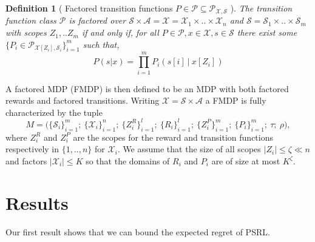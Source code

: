 \documentclass{article}
\newtheorem{mydef}{Definition}
\newcommand{\Xc}{\mathcal{X}}
\newcommand{\Pc}{\mathcal{P}}
\newcommand{\Sc}{\mathcal{S}}
\newcommand{\Ac}{\mathcal{A}}
\begin{document}
\begin{mydef}[ Factored transition functions $P \in \Pc \subseteq \Pc_{\Xc,\Sc}$ ]
\hspace{0.000000001mm} \newline
The transition function class $\Pc$ is factored over $\Sc \times \Ac = \Xc = \Xc_1 \times .. \times \Xc_n$ and $\Sc = \Sc_1 \times .. \times \Sc_m$ with scopes  $Z_1, .. Z_m$ if and only if,
for all $P \in \Pc, x \in \Xc, s \in \Sc$ there exist some $\{P_i \in \Pc_{\Xc[Z_i],\Sc_i}\}_{i=1}^m$ such that,
$$ P(s | x) = \prod_{i=1}^m P_i \left( s[i] \ \bigg\vert \ x[Z_i] \right) $$
\end{mydef}

A factored MDP (FMDP) is then defined to be an MDP with both factored rewards and factored transitions.
Writing $\Xc = \Sc \times \Ac$ a FMDP is fully characterized by the tuple
$$ M = \big( \{ \Sc_i \}_{i=1}^m ; \  \{ \Xc_i \}_{i=1}^n ; \   \{ Z^R_i \}_{i=1}^l;\  \{ R_i \}_{i=1}^l;\  \{ Z^P_i \}_{i=1}^m;\  \{ P_i \}_{i=1}^m;\  \tau;\  \rho  \big), $$
where $Z^R_i$ and $Z^P_i$ are the scopes for the reward and transition functions respectively in $\{1,..,n \}$ for $\Xc_i$.
We assume that the size of all scopes $| Z_i | \le \zeta \ll n$ and factors $|\Xc_i| \le K$ so that the domains of $R_i$ and $P_i$ are of size at most $K^\zeta$.


\section{Results}


Our first result shows that we can bound the expected regret of PSRL.
\end{document}
